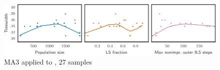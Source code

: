 \begin{figure}[h]\strictpagecheck\centering

\includegraphics[scale=0.85]{plots/MA3-correlation-regplots-fpsol2-i-3-0-crop.pdf}


\caption[Parameter influence for MA3 when applied to ]{\gls{MA3} applied to , 27 samples}

\label{MA3-correlation-regplots-fpsol2-i-3}

\end{figure}
